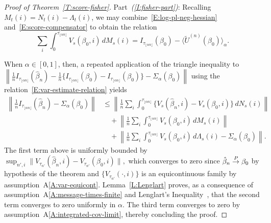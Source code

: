 \documentclass[aoas,preprint]{imsart}
\begin{document}
\begin{proof}[Proof of Theorem~\ref{T:score-fisher}]
Part~\textit{(\ref{I:fisher-part})}:
Recalling $M_t(i) = N_t(i) - \Lambda_t(i)$, we may combine~\eqref{E:log-pl-neg-hessian} and~\eqref{E:score-compensator} to obtain the relation
\begin{equation}\label{E:var-estimate-relation}
            \sum_i
            \int_0^{\tau_{\lfloor \alpha n \rfloor}}
                V_s(\beta_0, i) \, dM_s(i)
        =
            I_{\tau_{\lfloor \alpha n \rfloor}}(\beta_0)
        -
            \big\langle \tilde U^{(n)}(\beta_0) \big\rangle_\alpha.
\end{equation}

When $\alpha \in [0, 1]$, then, a repeated application of the triangle inequality 
to 
\(
    \left\|
        \tfrac{1}{n} I_{\tau_{\lfloor \alpha n \rfloor}}(\hat \beta_n)
        -
        \tfrac{1}{n} \{ I_{\tau_{\lfloor \alpha n \rfloor}}(\beta_0) - I_{\tau_{\lfloor \alpha n \rfloor}}(\beta_0) \}
        -
        \Sigma_{\alpha} (\beta_0)
    \right\|
\)
using the relation~\eqref{E:var-estimate-relation} yields
\begin{align*}
    \left\|
        \tfrac{1}{n} I_{\tau_{\lfloor \alpha n \rfloor}}(\hat \beta_n)
        -
        \Sigma_{\alpha} (\beta_0)
    \right\|
        &\leq
        \left\|
            \frac{1}{n}
            \sum_i
            \int_0^{\tau_{\lfloor \alpha n \rfloor}}
                \{
                    V_s(\hat \beta_n, i)
                    -
                    V_s(\beta_0, i)
                \} \, dN_s(i)
        \right\| \\
        &\quad+
        \left\|
            \frac{1}{n}
            \sum_i
            \int_0^{\tau_{\lfloor \alpha n \rfloor}}
                V_s(\beta_0, i) \, dM_s(i)
        \right\| \\
        &\quad+
        \left\|
            \frac{1}{n}
            \sum_i
            \int_0^{\tau_{\lfloor \alpha n \rfloor}}
                V_s(\beta_0,i)
                \, d\Lambda_s(i)
            -
            \Sigma_{\alpha}(\beta_0)
        \right\|.
\end{align*}
The first term above is uniformly bounded by
\(
    \sup_{n',i}
        \|
            V_{\tau_{n'}}(\hat \beta_n, i)
            -
            V_{\tau_{n'}}(\beta_0, i)
        \|,
\)
which converges to zero since $\hat \beta_n \overset{\mathit{P}}{\to} \beta_0$ by hypothesis of the theorem and
$\{ V_{\tau_{n'}}(\cdot, i) \}$ is an equicontinuous family by assumption~A\ref{A:var-equicont}.  Lemma~\ref{L:Lenglart} proves, as a consequence of assumption~A\ref{A:message-times-finite} and Lenglart's Inequality~\cite{lenglart1977relation}, that the second term converges to zero uniformly in $\alpha$.
The third term converges to zero by assumption~A\ref{A:integrated-cov-limit}, thereby concluding the proof.

\end{proof}
\end{document}
